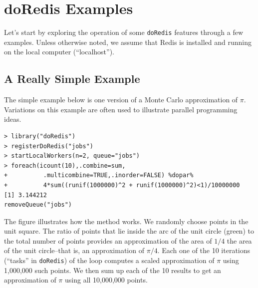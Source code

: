 \documentclass[12pt]{article}
\begin{document}
\section{doRedis Examples}

Let's start by exploring the operation of some {\tt doRedis} features through a
few examples.  Unless otherwise noted, we assume that Redis is installed and
running on the local computer (``localhost'').

\subsection{A Really Simple Example}

The simple example below is one version of a Monte Carlo
approximation of $\pi$. Variations on this example are often used to
illustrate parallel programming ideas. 
\begin{lstlisting}[float=ht,caption=Monte Carlo Example]
> library("doRedis")
> registerDoRedis("jobs")
> startLocalWorkers(n=2, queue="jobs")
> foreach(icount(10),.combine=sum,
+          .multicombine=TRUE,.inorder=FALSE) %dopar%
+          4*sum((runif(1000000)^2 + runif(1000000)^2)<1)/10000000
[1] 3.144212
removeQueue("jobs")
\end{lstlisting}
\begin{center}
\end{center}
The figure illustrates how the method works. We randomly choose points in the
unit square. The ratio of points that lie inside the arc of the unit circle
(green) to the total number of points provides an approximation of the area of
$1/4$ the area of the unit circle--that is, an approximation of $\pi/4$.  Each
one of the 10 iterations (``tasks'' in \verb+doRedis+) of the loop computes a
scaled approximation  of $\pi$ using 1,000,000 such points.  We then sum up
each of the 10 results to get an approximation of $\pi$ using all 10,000,000
points.
\end{document}
